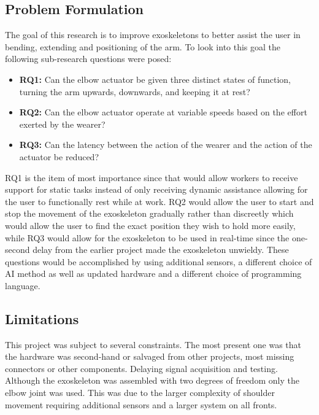 \subsection{Problem Formulation}
The goal of this research is to improve exoskeletons to better assist the user in bending, extending and positioning of the arm.
To look into this goal the following sub-research questions were posed:
\begin{itemize}
        
    \item \textbf{RQ1:} Can the elbow actuator be given three distinct states of function, turning the arm upwards, downwards, and keeping it at rest?

    \item \textbf{RQ2:} Can the elbow actuator operate at variable speeds based on the effort exerted by the wearer?

    \item \textbf{RQ3:} Can the latency between the action of the wearer and the action of the actuator be reduced?

\end{itemize}
RQ1 is the item of most importance since that would allow workers to receive support for static tasks instead of only receiving dynamic
assistance allowing for the user to functionally rest while at work. RQ2 would allow the user to start and stop the
movement of the exoskeleton gradually rather than discreetly which would allow the user to find the exact position they
wish to hold more easily, while RQ3 would allow for the exoskeleton to be used in real-time since the one-second delay from the earlier project made the exoskeleton unwieldy. 
These questions would be accomplished by using additional sensors, a different choice of AI method as well as updated hardware and a different
choice of programming language.\newline


\subsection{Limitations}
This project was subject to several constraints. 
The most present one was that the hardware was second-hand or salvaged from other projects, most missing connectors or other components.
Delaying signal acquisition and testing.
Although the exoskeleton was assembled with two degrees of freedom only the elbow joint was used.
This was due to the larger complexity of shoulder movement requiring additional sensors and a larger system on all
fronts.
